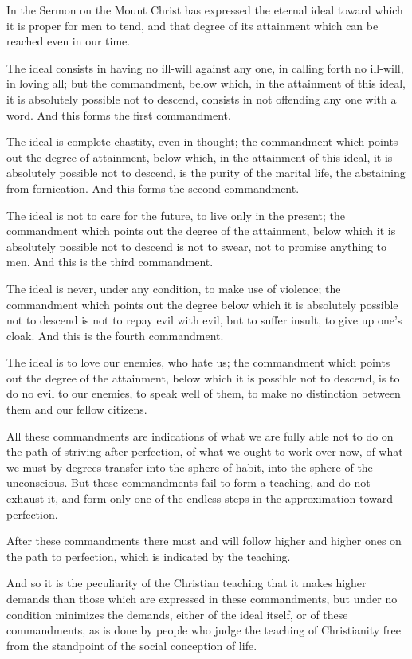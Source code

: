 \documentclass{book}
\begin{document}
In the Sermon on the Mount Christ has expressed the eternal ideal toward which it is proper for men to tend, and that degree of its attainment which can be reached even in our time.

The ideal consists in having no ill-will against any one, in calling forth no ill-will, in loving all; but the commandment, below which, in the attainment of this ideal, it is absolutely possible not to descend, consists in not offending any one with a word. And this forms the first commandment.

The ideal is complete chastity, even in thought; the commandment which points out the degree of attainment, below which, in the attainment of this ideal, it is absolutely possible not to descend, is the purity of the marital life, the abstaining from fornication. And this forms the second commandment.

The ideal is not to care for the future, to live only in the present; the commandment which points out the degree of the attainment, below which it is absolutely possible not to descend is not to swear, not to promise anything to men. And this is the third commandment.

The ideal is never, under any condition, to make use of violence; the commandment which points out the degree below which it is absolutely possible not to descend is not to repay evil with evil, but to suffer insult, to give up one’s cloak. And this is the fourth commandment.

The ideal is to love our enemies, who hate us; the commandment which points out the degree of the attainment, below which it is possible not to descend, is to do no evil to our enemies, to speak well of them, to make no distinction between them and our fellow citizens.

All these commandments are indications of what we are fully able not to do on the path of striving after perfection, of what we ought to work over now, of what we must by degrees transfer into the sphere of habit, into the sphere of the unconscious. But these commandments fail to form a teaching, and do not exhaust it, and form only one of the endless steps in the approximation toward perfection.

After these commandments there must and will follow higher and higher ones on the path to perfection, which is indicated by the teaching.

And so it is the peculiarity of the Christian teaching that it makes higher demands than those which are expressed in these commandments, but under no condition minimizes the demands, either of the ideal itself, or of these commandments, as is done by people who judge the teaching of Christianity free from the standpoint of the social conception of life.
\end{document}
